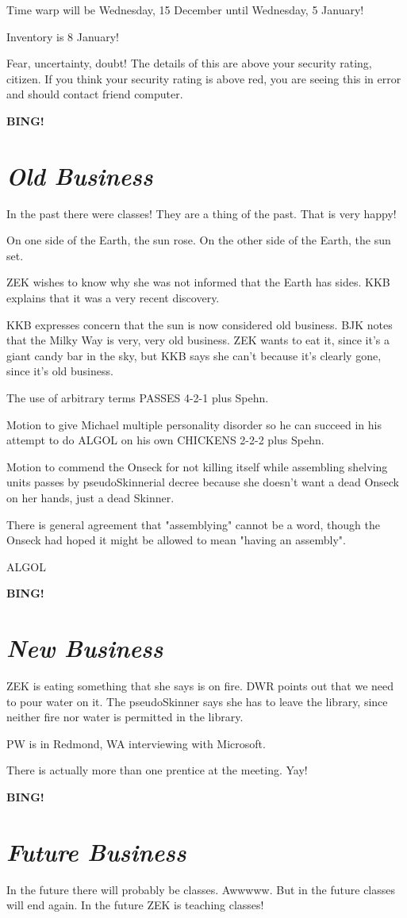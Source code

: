 \documentclass[10pt]{article}
\newcommand{\bing}{{\bf BING!} }
\newcommand{\goto}[1]{\bing \vskip 12pt \section*{{\em{#1}}}}
\newcommand{\ps}{ plus Spehn\xspace}
\begin{document}
Time warp will be Wednesday, 15 December until Wednesday, 5 January!

Inventory is 8 January!

Fear, uncertainty, doubt!  The details of this are above your security
rating, citizen.  If you think your security rating is above red, you
are seeing this in error and should contact friend computer.


\goto{Old Business}

In the past there were classes!  They are a thing of the past.  That is
very happy!

On one side of the Earth, the sun rose.  On the other side of the Earth,
the sun set.

ZEK wishes to know why she was not informed that the Earth has sides.
KKB explains that it was a very recent discovery.

KKB expresses concern that the sun is now considered old business.  BJK
notes that the Milky Way is very, very old business.  ZEK wants to eat it,
since it's a giant candy bar in the sky, but KKB says she can't because it's
clearly gone, since it's old business.

The use of arbitrary terms PASSES 4-2-1\ps.

Motion to give Michael multiple personality disorder so he can succeed in
his attempt to do ALGOL on his own CHICKENS 2-2-2\ps.

Motion to commend the Onseck for not killing itself while assembling
shelving units passes by pseudoSkinnerial decree because she doesn't
want a dead Onseck on her hands, just a dead Skinner. 

There is general agreement that "assemblying" cannot be a word, though
the Onseck had hoped it might be allowed to mean "having an assembly".

ALGOL

\goto{New Business}

ZEK is eating something that she says is on fire.  DWR points out that
we need to pour water on it.  The pseudoSkinner says she has to leave
the library, since neither fire nor water is permitted in the library.

PW is in Redmond, WA interviewing with Microsoft.

There is actually more than one prentice at the meeting.  Yay!

\goto{Future Business}

In the future there will probably be classes.  Awwwww.  But in the future
classes will end again.  In the future ZEK is teaching classes!
\end{document}
